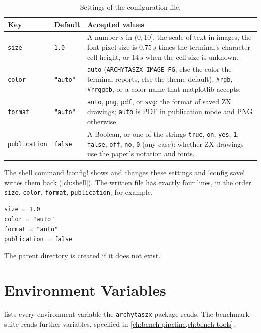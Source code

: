 \begin{table}[H]
\centering
\small
\begin{tabularx}{\linewidth}{@{}llX@{}}
\toprule
Key & Default & Accepted values \\
\midrule
\texttt{size} & \texttt{1.0} & A number $s$ in $(0, 10]$: the scale of text in images; the font pixel size is $0.75\,s$ times the terminal's character-cell height, or $14\,s$ when the cell size is unknown. \\
\texttt{color} & \texttt{"auto"} & \texttt{auto} (\texttt{ARCHYTASZX\_IMAGE\_FG}, else the color the terminal reports, else the theme default), \texttt{\#rgb}, \texttt{\#rrggbb}, or a color name that matplotlib accepts. \\
\texttt{format} & \texttt{"auto"} & \texttt{auto}, \texttt{png}, \texttt{pdf}, or \texttt{svg}: the format of saved ZX drawings; \texttt{auto} is PDF in publication mode and PNG otherwise. \\
\texttt{publication} & \texttt{false} & A Boolean, or one of the strings \texttt{true}, \texttt{on}, \texttt{yes}, \texttt{1}, \texttt{false}, \texttt{off}, \texttt{no}, \texttt{0} (any case): whether ZX drawings use the paper's notation and fonts. \\
\bottomrule
\end{tabularx}
\caption{Settings of the configuration file.}
\label{tab:install-config}
\end{table}

The shell command \azx!config! shows and changes these settings and \azx!config save! writes them back (\cref{ch:shell}). The written file has exactly four lines, in the order \texttt{size}, \texttt{color}, \texttt{format}, \texttt{publication}; for example,
\begin{lstlisting}[style=grammar]
size = 1.0
color = "auto"
format = "auto"
publication = false
\end{lstlisting}
The parent directory is created if it does not exist.

\section{Environment Variables}\label{sec:install-env}

 lists every environment variable the \texttt{archytaszx} package reads. The benchmark suite reads further variables, specified in \cref{ch:bench-pipeline,ch:bench-tools}.

